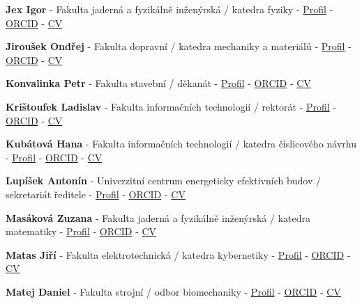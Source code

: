 \documentclass[11pt,a4paper]{article}
\newcommand{\memberComplete}[5]{%
  \item \textbf{#1} - #2 - \href{#3}{Profil} - \href{#4}{ORCID} - \href{#5}{CV}
}
\begin{document}
\begin{memberlist}
\memberComplete{Jex Igor}
{Fakulta jaderná a fyzikálně inženýrská / katedra fyziky}
{https://scholar.google.com/citations?user=9fT102MAAAAJ}
{https://orcid.org/0000-0001-6802-9852}
{https://drive.google.com/open?id=1ShXuBwLNiKsaaAfUUbIPmG2tgli3EAZf}

\memberComplete{Jiroušek Ondřej}
{Fakulta dopravní / katedra mechaniky a materiálů}
{https://scholar.google.com/citations?user=WTdDCKMAAAAJ}
{https://orcid.org/0000-0001-7065-6388}
{https://drive.google.com/open?id=1ZimsuPZnrs0JB6HFCdxrMPsZ7o17YtmR}

\memberComplete{Konvalinka Petr}
{Fakulta stavební / děkanát}
{https://www.researchgate.net/profile/Petr-Konvalinka-2}
{https://orcid.org/0000-0001-7372-477X}
{https://drive.google.com/open?id=1j2F-pN7VekHjjDfIEzKyoyewdV--u-AU}

\memberComplete{Krištoufek Ladislav}
{Fakulta informačních technologií / rektorát}
{https://scholar.google.com/citations?user=EHbSKnkAAAAJ\&hl=en\&oi=ao}
{https://orcid.org/0000-0003-4843-9373}
{https://drive.google.com/open?id=19Fh1VF167QL69OjkmsxaHw3sYSWVWvD4}

\memberComplete{Kubátová Hana}
{Fakulta informačních technologií / katedra číslicového návrhu}
{https://scholar.google.com/citations?user=Rkd929IAAAAJ}
{https://orcid.org/0000-0002-5011-6891}
{https://drive.google.com/open?id=1YKmVq2yqX-G16SD5LCCO8EglglH9S0mr}

\memberComplete{Lupíšek Antonín}
{Univerzitní centrum energeticky efektivních budov / sekretariát ředitele}
{https://scholar.google.com/citations?user=qIE7zZgAAAAJ}
{https://orcid.org/0000-0002-3142-2631}
{https://drive.google.com/open?id=17_MkuagIJLEE18dEXQY4-mobnhLdvweB}

\memberComplete{Masáková Zuzana}
{Fakulta jaderná a fyzikálně inženýrská / katedra matematiky}
{https://mathscinet.ams.org/mathscinet/author?authorId=635063}
{https://orcid.org/0000-0003-1191-8688}
{https://drive.google.com/open?id=1cegrsSyYO0WLC6oININ4plldtZW-gVmf}

\memberComplete{Matas Jiří}
{Fakulta elektrotechnická / katedra kybernetiky}
{https://scholar.google.com/citations?user=EJCNY6QAAAAJ}
{https://orcid.org/0000-0003-0863-4844}
{https://drive.google.com/open?id=1eB_b5wQw-zr_bV_hmkC1QoraJh698bRH}

\memberComplete{Matej Daniel}
{Fakulta strojní / odbor biomechaniky}
{https://scholar.google.com/citations?user=lQDKAA8AAAAJ}
{https://orcid.org/0000-0003-0532-1965}
{https://drive.google.com/open?id=116JGYU26p8GwdMzf9e1gMxBNcZPx7EKJ}


\end{memberlist}
\end{document}
